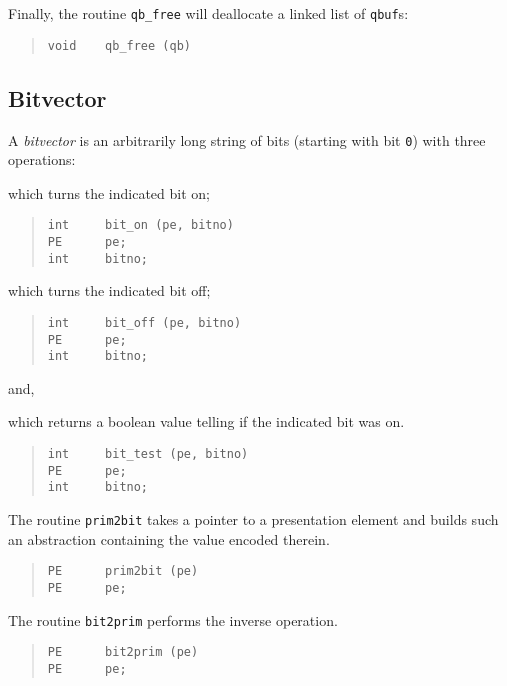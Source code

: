 Finally,
the routine \verb"qb_free" will deallocate a linked list of \verb"qbuf"s:
\begin{quote}\small\begin{verbatim}
void    qb_free (qb)
\end{verbatim}\end{quote}

\subsection	{Bitvector}\label{psap:bits}
A {\em bitvector\/} is an arbitrarily long string of bits
(starting with bit \verb"0") with three operations:
\begin{describe}
\item[\verb"bit\_on":] which turns the indicated bit on;
\begin{quote}\small\begin{verbatim}
int     bit_on (pe, bitno)
PE      pe;
int     bitno;
\end{verbatim}\end{quote}

\item[\verb"bit\_off":] which turns the indicated bit off;
\begin{quote}\small\begin{verbatim}
int     bit_off (pe, bitno)
PE      pe;
int     bitno;
\end{verbatim}\end{quote}
and,

\item[\verb"bit\_test":] which returns a boolean value telling if the indicated
bit was on.
\begin{quote}\small\begin{verbatim}
int     bit_test (pe, bitno)
PE      pe;
int     bitno;
\end{verbatim}\end{quote}
\end{describe}
The routine \verb"prim2bit" takes a pointer to a presentation element and
builds such an abstraction containing the value encoded therein.
\begin{quote}\small\begin{verbatim}
PE      prim2bit (pe)
PE      pe;
\end{verbatim}\end{quote}
The routine \verb"bit2prim" performs the inverse operation.
\begin{quote}\small\begin{verbatim}
PE      bit2prim (pe)
PE      pe;
\end{verbatim}\end{quote}

